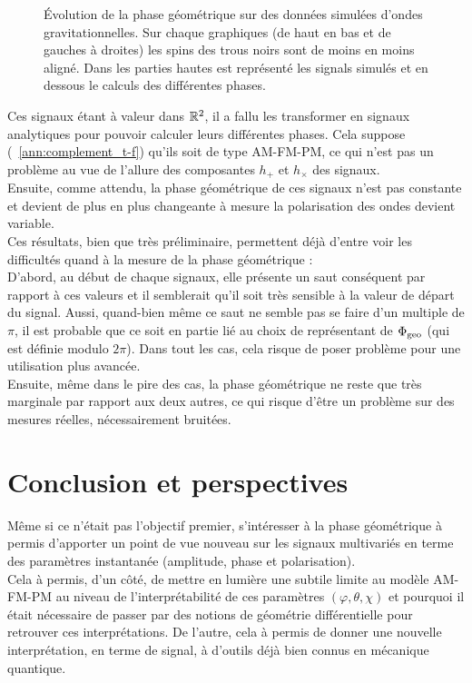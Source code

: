 \begin{figure}[h]
	\caption[Évolution de la phase géométrique sur des données simulées d'ondes gravitationnelles]{Évolution de la phase géométrique sur des données simulées d'ondes gravitationnelles. Sur chaque graphiques (de haut en bas et de gauches à droites) les spins des trous noirs sont de moins en moins aligné. Dans les parties hautes est représenté les signals simulés et en dessous le calculs des différentes phases.}
\end{figure}

Ces signaux étant à valeur dans $\mathbb{R}^2$, il a fallu les transformer en signaux analytiques pour pouvoir calculer leurs différentes phases. Cela suppose (\cf~\ref{ann:complement_t-f}) qu'ils soit de type AM-FM-PM, ce qui n'est pas un problème au vue de l'allure des composantes $h_+$ et $h_\times$ des signaux.
\\
Ensuite, comme attendu, la phase géométrique de ces signaux n'est pas constante et devient de plus en plus changeante à mesure la polarisation des ondes devient variable.
\\

Ces résultats, bien que très préliminaire, permettent déjà d'entre voir les difficultés quand à la mesure de la phase géométrique :
\\
D'abord, au début de chaque signaux, elle présente un saut conséquent par rapport à ces valeurs et il semblerait qu'il soit très sensible à la valeur de départ du signal. Aussi, quand-bien même ce saut ne semble pas se faire d'un multiple de $\pi$, il est probable que ce soit en partie lié au choix de représentant de $\Phi_{\text{\normalfont geo}}$ (qui est définie modulo $2\pi$).
Dans tout les cas, cela risque de poser problème pour une utilisation plus avancée.
\\
Ensuite, même dans le pire des cas, la phase géométrique ne reste que très marginale par rapport aux deux autres, ce qui risque d'être un problème sur des mesures réelles, nécessairement bruitées.
\\




\section{Conclusion et perspectives}

Même si ce n'était pas l'objectif premier, s’intéresser à la phase géométrique à permis d'apporter un point de vue nouveau sur les signaux multivariés en terme des paramètres instantanée (amplitude, phase et polarisation). 
\\
Cela à permis, d'un côté, de mettre en lumière une subtile limite au modèle AM-FM-PM au niveau de l'interprétabilité de ces paramètres $(\varphi, \theta, \chi)$ et pourquoi il était nécessaire de passer par des notions de géométrie différentielle pour retrouver ces interprétations. 
De l'autre, cela à permis de donner une nouvelle interprétation, en terme de signal, à d'outils déjà bien connus en mécanique quantique.
\\

